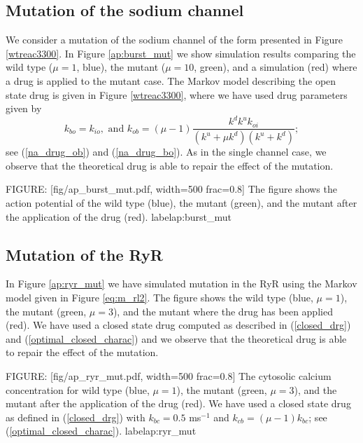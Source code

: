 \subsection{Mutation of the sodium channel}

We consider a mutation of the sodium channel of the form presented in Figure \ref{wtreac3300}.
In Figure \ref{ap:burst_mut} we show simulation results comparing the wild type ($\mu=1$, blue),
the mutant ($\mu=10$, green), and a simulation (red) where  a drug is applied to the mutant case.
The Markov model describing the open state drug is given
in Figure \ref{wtreac3300}, where we have used drug parameters given by
\[
k_{bo} = k_{io}, \mbox{\ and \ }
k_{ob}=\left(  \mu-1\right)  \frac{k^{d}k^{u}k_{oi}}{\left(  k^{u}+\mu
k^{d}\right)  \left(  k^{u}+k^{d}\right)  };
\]
see (\ref{na_drug_ob}) and (\ref{na_drug_bo}).
As in the single channel case, we observe that the theoretical drug is able to repair the effect of the mutation.


FIGURE: [fig/ap_burst_mut.pdf, width=500 frac=0.8] The figure shows the action potential of the wild type (blue), the mutant (green), and the
mutant after the application of the drug (red). label{ap:burst_mut}

\subsection{Mutation of the RyR}

In Figure \ref{ap:ryr_mut} we have simulated mutation in the RyR using the Markov model given in Figure \ref{eq:m_rl2}. The figure shows the
wild type (blue, $\mu=1$), the mutant (green, $\mu=3$), and the mutant where the drug has been applied (red). We have used a closed state drug  computed as described in (\ref{closed_drg}) and (\ref{optimal_closed_charac}) and we observe that the theoretical drug is able to repair the effect of the mutation.






FIGURE: [fig/ap_ryr_mut.pdf, width=500 frac=0.8] The cytosolic calcium concentration for wild type (blue, $\mu=1$), the mutant (green, $\mu=3$), and the mutant after the application of the drug (red). We have used a closed state drug  as defined in (\ref{closed_drg}) with $k_{bc}=0.5$ ms$^{-1}$ and $k_{cb}=(\mu-1)k_{bc}$; see (\ref{optimal_closed_charac}).  label{ap:ryr_mut}

